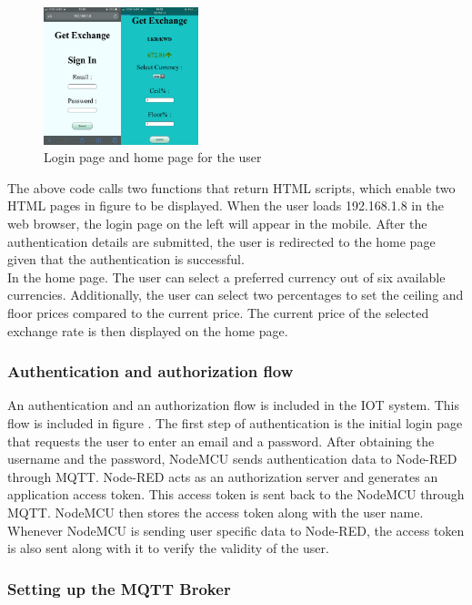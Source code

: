 \begin{figure}[H]
    \centering
      \includegraphics[width=0.4\textwidth]{images/login.png}
    \caption{Login page and home page for the user}
    \label{host}
\end{figure}

The above code calls two functions that return HTML scripts, which enable two HTML pages in figure  to be displayed. When the user loads 192.168.1.8 in the web browser, the login page on the left will appear in the mobile. After the authentication details are submitted, the user is redirected to the home page given that the authentication is successful.\\

In the home page. The user can select a preferred currency out of six available currencies. Additionally, the user can select two percentages to set the ceiling and floor prices compared to the current price. The current price of the selected exchange rate is then displayed on the home page.

\subsubsection{Authentication and authorization flow}

An authentication and an authorization flow is included in the IOT system. This flow is included in figure  . The first step of authentication is the initial login page that requests the user to enter an email and a password. After obtaining the username and the password, NodeMCU sends authentication data to Node-RED through MQTT. Node-RED acts as an authorization server and generates an application access token. This access token is sent back to the NodeMCU through MQTT. NodeMCU then stores the access token along with the user name. Whenever NodeMCU is sending user specific data to Node-RED, the access token is also sent along with it to verify the validity of the user.

\subsubsection{Setting up the MQTT Broker}

